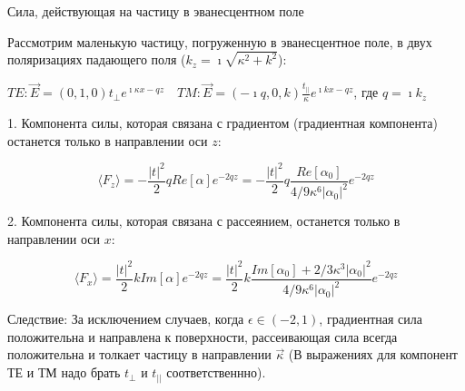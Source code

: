 \documentclass[9pt, compress, xcolor=table]{beamer}
\begin{document}
\begin{frame}{Сила, действующая на частицу в эванесцентном поле}

Рассмотрим маленькую частицу, погруженную в эванесцентное поле, в двух поляризациях падающего поля ($k_z=\imath\sqrt{\kappa^2+k^2}$):

$TE: \vec E=(0,1,0)t_{\perp}e^{\imath \kappa x-qz}\quad TM: \vec E=(-\imath q,0,k)\frac{t_{||}}{\kappa}e^{\imath k x-qz}$, где $q=\imath k_z$

1. Компонента силы, которая связана с \textcolor{red!50!black}{градиентом} (градиентная компонента) останется только в направлении оси $z$:

\begin{equation*}
    \langle F_z\rangle=-\frac{|t|^2}{2} q Re[\alpha]e^{-2qz}=-\frac{|t|^2}{2} q \frac{Re[\alpha_0]}{4/9\kappa^6|\alpha_0|^2}e^{-2qz}
\end{equation*}

2. Компонента силы, которая связана с \textcolor{red!50!black}{рассеянием}, останется только в направлении оси $x$:

\begin{equation*}
    \langle F_x\rangle=\frac{|t|^2}{2} k Im[\alpha]e^{-2qz}=\frac{|t|^2}{2} k \frac{Im[\alpha_0]+2/3\kappa^3|\alpha_0|^2}{4/9\kappa^6|\alpha_0|^2}e^{-2qz}
\end{equation*}

\textcolor{red!50!black}{Следствие:} За исключением случаев, когда $\epsilon \in (-2,1)$, градиентная сила положительна и направлена к поверхности, рассеивающая сила всегда положительна и толкает частицу в направлении $\vec \kappa$ (В выражениях для компонент ТЕ и ТМ надо брать $t_{\perp}$ и $t_{||}$ соответственнно).

\end{frame}
\end{document}

